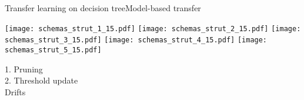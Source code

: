 \begin{frame}{Transfer learning on decision tree}{Model-based transfer}
\begin{minipage}[t]{0.49\linewidth}
    \renewcommand{\ratio}{0.55}
    \begin{overprint}
        \centering\texttt{[image: schemas\_strut\_1\_15.pdf]}
        \centering\texttt{[image: schemas\_strut\_2\_15.pdf]}
        \centering\texttt{[image: schemas\_strut\_3\_15.pdf]}
        \centering\texttt{[image: schemas\_strut\_4\_15.pdf]}
        \centering\texttt{[image: schemas\_strut\_5\_15.pdf]}
    \end{overprint}
    \textcolor{myorange}{1. Pruning}\\
    \textcolor{myblue}{2. Threshold update}\\
    \bigskip
    Drifts
\end{minipage}

\cite{segev2017learn}

\end{frame}

